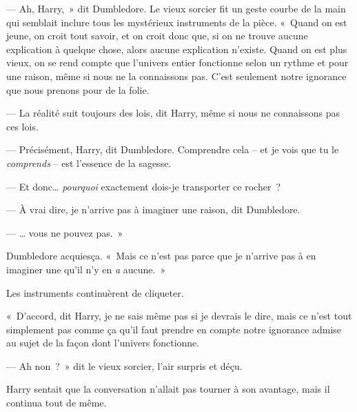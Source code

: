 --- Ah, Harry,~» dit Dumbledore. Le vieux sorcier fit un geste courbe de la main qui semblait inclure tous les mystérieux instruments de la pièce. «~Quand on est jeune, on croit tout savoir, et on croit donc que, si on ne trouve aucune explication à quelque chose, alors aucune explication n'existe. Quand on est plus vieux, on se rend compte que l'univers entier fonctionne selon un rythme et pour une raison, même si nous ne la connaissons pas. C'est seulement notre ignorance que nous prenons pour de la folie.

--- La réalité suit toujours des lois, dit Harry, même si nous ne connaissons pas ces lois.

--- Précisément, Harry, dit Dumbledore. Comprendre cela -- et je vois que tu le \emph{comprends} -- est l'essence de la sagesse.

--- Et donc… \emph{pourquoi} exactement dois-je transporter ce rocher~?

--- À vrai dire, je n'arrive pas à imaginer une raison, dit Dumbledore.

--- … vous ne pouvez pas.~»

Dumbledore acquiesça. «~Mais ce n'est pas parce que je n'arrive pas à en imaginer une qu'il n'y en \emph{a} aucune.~»

Les instruments continuèrent de cliqueter.

«~D'accord, dit Harry, je ne sais même pas si je devrais le dire, mais ce n'est tout simplement pas comme ça qu'il faut prendre en compte notre ignorance admise au sujet de la façon dont l'univers fonctionne.

--- Ah non~?~» dit le vieux sorcier, l'air surpris et déçu.

Harry sentait que la conversation n'allait pas tourner à son avantage, mais il continua tout de même.

